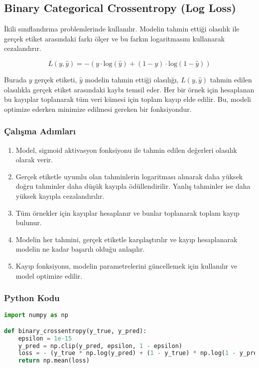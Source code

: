 \newpage

\subsection{Binary Categorical Crossentropy (Log Loss)}

İkili sınıflandırma problemlerinde kullanılır. Modelin tahmin ettiği olasılık ile gerçek etiket arasındaki farkı ölçer ve bu farkın logaritmasını kullanarak cezalandırır. 

\[ L(y, \hat{y}) = - (y \cdot \text{log}(\hat{y}) + (1 - y) \cdot \text{log}(1 - \hat{y})) \]

Burada $y$ gerçek etiketi, $\hat{y}$ modelin tahmin ettiği olasılığı, $L(y, \hat{y})$ tahmin edilen olasılıkla gerçek etiket arasındaki kaybı temsil eder. Her bir örnek için hesaplanan bu kayıplar toplanarak tüm veri kümesi için toplam kayıp elde edilir. Bu, modeli optimize ederken minimize edilmesi gereken bir fonksiyondur.

\subsubsection{Çalışma Adımları}

\begin{enumerate}
    \item Model, sigmoid aktivasyon fonksiyonu ile tahmin edilen değerleri olasılık olarak verir.
    \item Gerçek etiketle uyumlu olan tahminlerin logaritması alınarak daha yüksek doğru tahminler daha düşük kayıpla ödüllendirilir. Yanlış tahminler ise daha yüksek kayıpla cezalandırılır.
    \item Tüm örnekler için kayıplar hesaplanır ve bunlar toplanarak toplam kayıp bulunur.
    \item Modelin her tahmini, gerçek etiketle karşılaştırılır ve kayıp hesaplanarak modelin ne kadar başarılı olduğu anlaşılır.
    \item Kayıp fonksiyonu, modelin parametrelerini güncellemek için kullanılır ve model optimize edilir.
\end{enumerate}

\subsubsection{Python Kodu}

\begin{lstlisting}[language=Python]
import numpy as np

def binary_crossentropy(y_true, y_pred):
    epsilon = 1e-15
    y_pred = np.clip(y_pred, epsilon, 1 - epsilon)
    loss = - (y_true * np.log(y_pred) + (1 - y_true) * np.log(1 - y_pred))
    return np.mean(loss)
\end{lstlisting}

